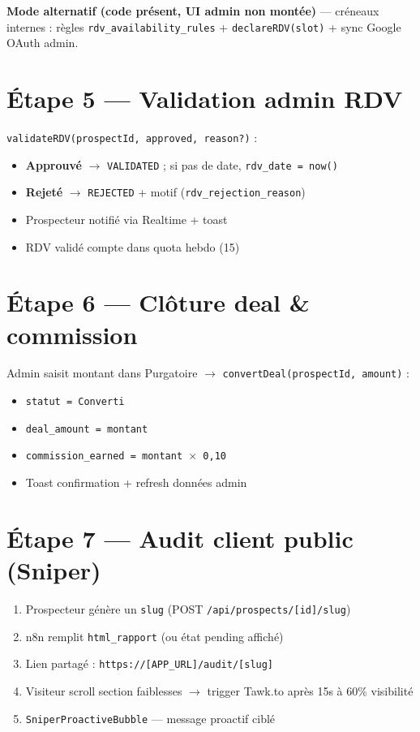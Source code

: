 \documentclass[11pt,a4paper]{report}
\begin{document}
\textbf{Mode alternatif (code présent, UI admin non montée)} --- créneaux internes :
règles \texttt{rdv\_availability\_rules} + \texttt{declareRDV(slot)} + sync Google OAuth admin.

\section{Étape 5 --- Validation admin RDV}

\texttt{validateRDV(prospectId, approved, reason?)} :
\begin{itemize}[noitemsep]
  \item \textbf{Approuvé} $\rightarrow$ \texttt{VALIDATED} ; si pas de date, \texttt{rdv\_date = now()}
  \item \textbf{Rejeté} $\rightarrow$ \texttt{REJECTED} + motif (\texttt{rdv\_rejection\_reason})
  \item Prospecteur notifié via Realtime + toast
  \item RDV validé compte dans quota hebdo (15)
\end{itemize}

\section{Étape 6 --- Clôture deal \& commission}

Admin saisit montant dans Purgatoire $\rightarrow$ \texttt{convertDeal(prospectId, amount)} :
\begin{itemize}[noitemsep]
  \item \texttt{statut = Converti}
  \item \texttt{deal\_amount = montant}
  \item \texttt{commission\_earned = montant $\times$ 0{,}10}
  \item Toast confirmation + refresh données admin
\end{itemize}

\section{Étape 7 --- Audit client public (Sniper)}

\begin{enumerate}
  \item Prospecteur génère un \texttt{slug} (POST \texttt{/api/prospects/[id]/slug})
  \item n8n remplit \texttt{html\_rapport} (ou état pending affiché)
  \item Lien partagé : \texttt{https://[APP\_URL]/audit/[slug]}
  \item Visiteur scroll section faiblesses $\rightarrow$ trigger Tawk.to après 15s à 60\% visibilité
  \item \texttt{SniperProactiveBubble} --- message proactif ciblé
\end{enumerate}
\end{document}
